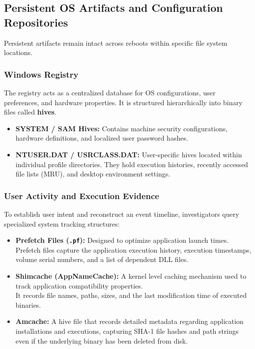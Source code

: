 \subsection{Persistent OS Artifacts and Configuration Repositories}

Persistent artifacts remain intact across reboots within specific file system locations. 

\subsubsection*{Windows Registry}
The registry acts as a centralized database for OS configurations, user preferences, and hardware properties. It is structured hierarchically into binary files called \textbf{hives}.
\begin{itemize}
    \item \textbf{SYSTEM / SAM Hives:} Contains machine security configurations, hardware definitions, and localized user password hashes.
    \item \textbf{NTUSER.DAT / USRCLASS.DAT:} User-specific hives located within individual profile directories. They hold execution histories, recently accessed file lists (MRU), and desktop environment settings.
\end{itemize}

\subsubsection*{User Activity and Execution Evidence}
To establish user intent and reconstruct an event timeline, investigators query specialized system tracking structures:
\begin{itemize}
    \item \textbf{Prefetch Files (\texttt{.pf}):} Designed to optimize application launch times.\\
    Prefetch files capture the application execution history, execution timestamps, volume serial numbers, and a list of dependent DLL files.
    \item \textbf{Shimcache (AppNameCache):} A kernel level caching mechanism used to track application compatibility properties.\\
    It records file names, paths, sizes, and the last modification time of executed binaries.
    \item \textbf{Amcache:} A hive file that records detailed metadata regarding application installations and executions, capturing SHA-1 file hashes and path strings even if the underlying binary has been deleted from disk.
\end{itemize}

